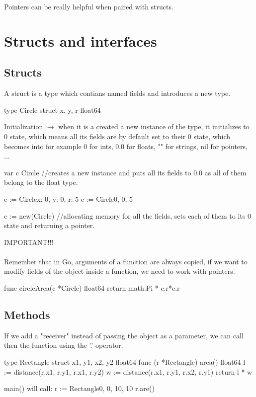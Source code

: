 \documentclass[twoside,a4paper,english]{report}
\begin{document}
Pointers can be really helpful when paired with structs.
\chapter{Structs and interfaces}
\section{Structs}
A struct is a type which contians named fields and introduces a new type.
\begin{go}
type Circle struct {
  x, y, r float64
}
\end{go}
\vspace{0.7cm}
Initialization $\rightarrow$ when it is a created a new instance of the type, it initializes to 0 state, which means all its fields are by default set to their 0 state, which becomes into for example 0 for ints, 0.0 for floats, "" for strings, nil for pointers, ...
\begin{go}
var c Circle    //creates a new instance and puts all its fields to 0.0 as all of them belong to the float type.

c := Circle{x: 0, y: 0, r: 5}
c := Circle{0, 0, 5}

c := new(Circle)  //allocating memory for all the fields, sets each of them to its 0 state and returning a pointer.
\end{go}
\vspace{0.7cm}
{\color{my_blue}IMPORTANT!!!}\\\\ 
Remember that in Go, arguments of a function are always copied, if we want to modify fields of the object inside a function, we need to work with pointers.
\begin{go}
func circleArea(c *Circle) float64 {
    return math.Pi * c.r*c.r
}
\end{go}
\section{Methods}
If we add a "receiver" instead of passing the object as a parameter, we can call then the function using the '.' operator.
\begin{go}
type Rectangle struct {
  x1, y1, x2, y2 float64
}
func (r *Rectangle) area() float64 {
  l := distance(r.x1, r.y1, r.x1, r.y2)
  w := distance(r.x1, r.y1, r.x2, r.y1)
  return l * w
}

main() will call:
    r := Rectangle{0, 0, 10, 10}
    r.are()

\end{go}    
\end{document}
